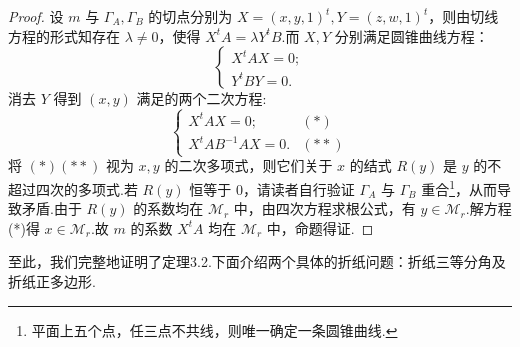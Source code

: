 \begin{proof}
    设 $m$ 与 $\Gamma_A,\Gamma_B$ 的切点分别为 $X=(x,y,1)^t,Y=(z,w,1)^t$，则由切线方程的形式知存在 $\lambda\neq 0$，使得 $X^tA=\lambda Y^tB$.而 $X,Y$ 分别满足圆锥曲线方程：
    $$
    \begin{cases}
        X^tAX=0;\\
        Y^tBY=0.
    \end{cases}
    $$
    消去 $Y$ 得到 $(x,y)$ 满足的两个二次方程:
    $$
    \begin{cases}
        X^tAX=0;\qquad &(*)\\
        X^tAB^{-1}AX=0. &(**)
    \end{cases}
    $$
    将 $(*)(**)$ 视为 $x,y$ 的二次多项式，则它们关于 $x$ 的结式 $R(y)$ 是 $y$ 的不超过四次的多项式.若 $R(y)$ 恒等于 $0$，请读者自行验证 $\Gamma_A$ 与 $\Gamma_B$ 重合\footnote{平面上五个点，任三点不共线，则唯一确定一条圆锥曲线.}，从而导致矛盾.由于 $R(y)$ 的系数均在 $\mathcal{M}_r$ 中，由四次方程求根公式，有 $y\in\mathcal{M}_r$.解方程(*)得 $x\in\mathcal{M}_r$.故 $m$ 的系数 $X^tA$ 均在 $\mathcal{M}_r$ 中，命题得证.
\end{proof}

至此，我们完整地证明了定理3.2.下面介绍两个具体的折纸问题：折纸三等分角及折纸正多边形.